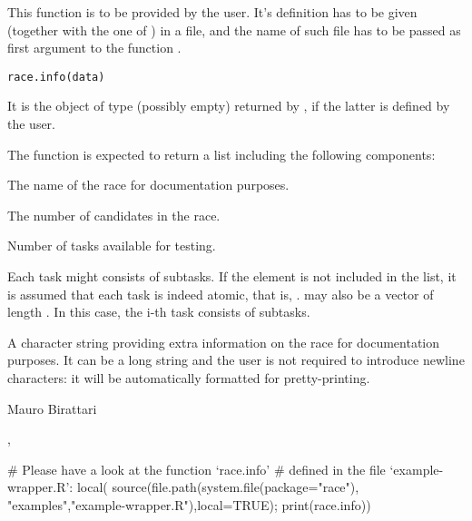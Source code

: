 \begin{Description}\relax
This function is to be provided by the user. It's
definition has to be given (together with the one of
) in a file, and the name of such file
has to be passed as first argument to the function .
\end{Description}
\begin{Usage}
\begin{verbatim}race.info(data)\end{verbatim}
\end{Usage}
\begin{Arguments}
\begin{ldescription}
\item[\code{data}] It is the object of type  (possibly empty)
returned by , if the latter is defined by the
user.
\end{ldescription}
\end{Arguments}
\begin{Value}
The function  is expected
to return a list including the following components:

\begin{ldescription}
\item[\code{race.name}] The name of the race for documentation
purposes.
\item[\code{no.candidates}] The number of candidates in the
race.
\item[\code{no.tasks}] Number of tasks available for testing.
\item[\code{no.subtasks}] Each task might consists of  
subtasks. If the element  is not included in
the list, it is assumed that each task is indeed atomic,
that is, .  may also be a
vector of length . In this case, the i-th task 
consists of  subtasks.
\item[\code{extra}] A character string providing extra
information on the race for documentation purposes. It can be a long
string and the user is not required to introduce newline characters:
it will be automatically formatted for pretty-printing.
\end{ldescription}
\end{Value}
\begin{Author}\relax
Mauro Birattari
\end{Author}
\begin{SeeAlso}\relax
{}, 
\end{SeeAlso}
\begin{Examples}
\begin{ExampleCode}
# Please have a look at the function `race.info'
# defined in the file `example-wrapper.R':
local({
  source(file.path(system.file(package="race"),
                           "examples","example-wrapper.R"),local=TRUE);
  print(race.info)})
\end{ExampleCode}
\end{Examples}

